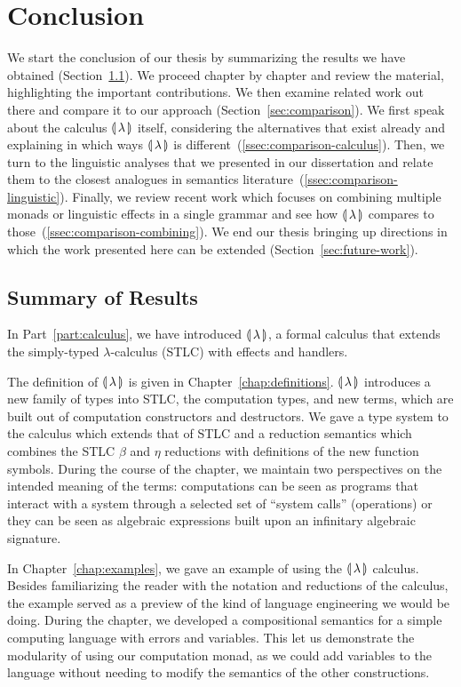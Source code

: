 \chapter{Conclusion}
\label{chap:conclusion}

We start the conclusion of our thesis by summarizing the results we have
obtained (Section~\ref{sec:summary}). We proceed chapter by chapter and
review the material, highlighting the important contributions. We then
examine related work out there and compare it to our approach
(Section~\ref{sec:comparison}). We first speak about the calculus ${\llparenthesis \, \lambda \, \rrparenthesis}$
itself, considering the alternatives that exist already and explaining in
which ways ${\llparenthesis \, \lambda \, \rrparenthesis}$ is different~(\ref{ssec:comparison-calculus}). Then, we
turn to the linguistic analyses that we presented in our dissertation and
relate them to the closest analogues in semantics
literature~(\ref{ssec:comparison-linguistic}). Finally, we review recent
work which focuses on combining multiple monads or linguistic effects in a
single grammar and see how ${\llparenthesis \, \lambda \, \rrparenthesis}$ compares to
those~(\ref{ssec:comparison-combining}). We end our thesis bringing up
directions in which the work presented here can be extended
(Section~\ref{sec:future-work}).

\minitoc


\section{Summary of Results}
\label{sec:summary}

In Part~\ref{part:calculus}, we have introduced ${\llparenthesis \, \lambda \, \rrparenthesis}$, a formal calculus
that extends the simply-typed $\lambda$-calculus (STLC) with effects and
handlers.

The definition of ${\llparenthesis \, \lambda \, \rrparenthesis}$ is given in
Chapter~\ref{chap:definitions}. ${\llparenthesis \, \lambda \, \rrparenthesis}$ introduces a new family of types
into STLC, the computation types, and new terms, which are built out of
computation constructors and destructors. We gave a type system to the
calculus which extends that of STLC and a reduction semantics which
combines the STLC $\beta$ and $\eta$ reductions with definitions of the new
function symbols. During the course of the chapter, we maintain two
perspectives on the intended meaning of the terms: computations can be seen
as programs that interact with a system through a selected set of ``system
calls'' (operations) or they can be seen as algebraic expressions built
upon an infinitary algebraic signature.

In Chapter~\ref{chap:examples}, we gave an example of using the ${\llparenthesis \, \lambda \, \rrparenthesis}$
calculus. Besides familiarizing the reader with the notation and reductions
of the calculus, the example served as a preview of the kind of language
engineering we would be doing. During the chapter, we developed a
compositional semantics for a simple computing language with errors and
variables. This let us demonstrate the modularity of using our computation
monad, as we could add variables to the language without needing to modify
the semantics of the other constructions.

